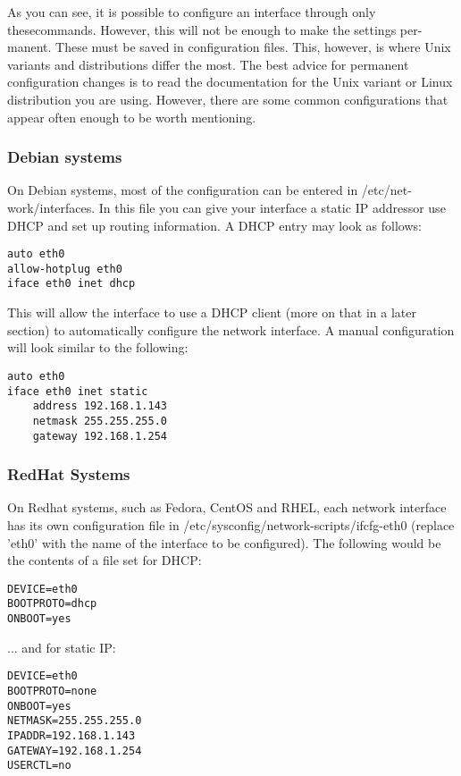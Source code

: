 As you can see, it is possible to configure an interface through only thesecommands. However, this will not be enough to make the settings per-manent. These must be saved in configuration files. This, however, is where Unix variants and distributions differ the most.  The best advice for permanent configuration changes is to read the documentation for the Unix variant or Linux distribution you are using. However, there are some common configurations that appear often enough to be worth mentioning.

\subsubsection{Debian systems}

On Debian systems, most of the configuration can be entered in /etc/net-work/interfaces. In this file you can give your interface a static IP addressor use DHCP and set up routing information. A DHCP entry may look as follows:

\begin{verbatim}
auto eth0
allow-hotplug eth0
iface eth0 inet dhcp
\end{verbatim}

This will allow the interface to use a DHCP client (more on that in a later section) to automatically configure the network interface. A manual configuration will look similar to the following:

\begin{verbatim}
auto eth0
iface eth0 inet static
    address 192.168.1.143
    netmask 255.255.255.0
    gateway 192.168.1.254
\end{verbatim}

\subsubsection{RedHat Systems}

On Redhat systems, such as Fedora, CentOS and RHEL, each network interface has its own configuration file in /etc/sysconfig/network-scripts/ifcfg-eth0 (replace ’eth0’ with the name of the interface to be configured). The following would be the contents of a file set for DHCP:

\begin{verbatim}
DEVICE=eth0
BOOTPROTO=dhcp
ONBOOT=yes
\end{verbatim}

... and for static IP:

\begin{verbatim}
DEVICE=eth0
BOOTPROTO=none
ONBOOT=yes
NETMASK=255.255.255.0
IPADDR=192.168.1.143
GATEWAY=192.168.1.254
USERCTL=no
\end{verbatim}


